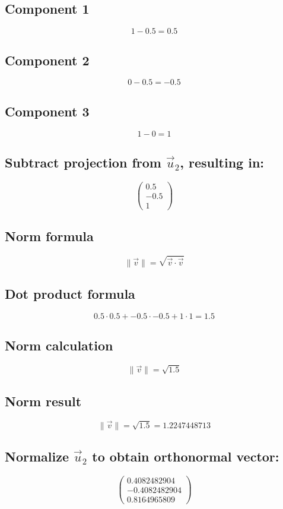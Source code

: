 \documentclass{article}
\begin{document}
\subsection*{ \vspace{1em} Component 1}
\[
1 - 0.5 = 0.5
\]
\subsection*{ \vspace{1em} Component 2}
\[
0 - 0.5 = -0.5
\]
\subsection*{ \vspace{1em} Component 3}
\[
1 - 0 = 1
\]
\subsection*{ \vspace{1em} Subtract projection from \(\vec{u}_{2}\), resulting in:}
\[
\begin{pmatrix}0.5 \\ -0.5 \\ 1\end{pmatrix}
\]
\subsection*{ \vspace{1em} Norm formula}
\[
\|\vec{v}\| = \sqrt{\vec{v} \cdot \vec{v}}
\]
\subsection*{ \vspace{1em} Dot product formula}
\[
0.5 \cdot 0.5 + -0.5 \cdot -0.5 + 1 \cdot 1 = 1.5
\]
\subsection*{ \vspace{1em} Norm calculation}
\[
\|\vec{v}\| = \sqrt{1.5}
\]
\subsection*{ \vspace{1em} Norm result}
\[
\|\vec{v}\| = \sqrt{1.5} = 1.2247448713
\]
\subsection*{ \vspace{1em} Normalize \(\vec{u}_{2}\) to obtain orthonormal vector:}
\[
\begin{pmatrix}0.4082482904 \\ -0.4082482904 \\ 0.8164965809\end{pmatrix}
\]
\end{document}
